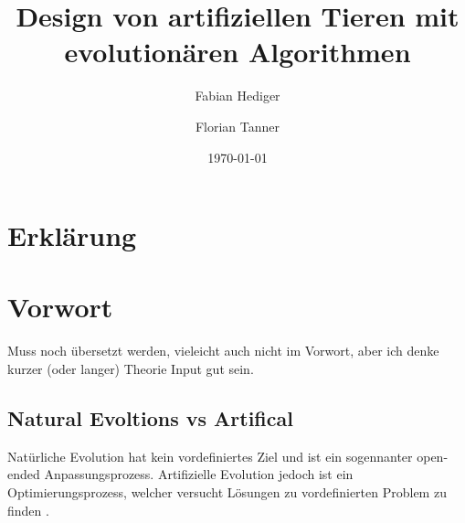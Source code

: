 %
%





  \title{Design von artifiziellen Tieren mit evolutionären Algorithmen}
  \author{Fabian Hediger \and Florian Tanner}
  \date{\today}

  \frontmatter

  
  

  \chapter{Erklärung}
    \lipsum[1]

  \chapter{Vorwort}

    Muss noch übersetzt werden, vieleicht auch nicht im Vorwort, aber ich denke kurzer (oder langer) Theorie Input gut sein.

    \section{Natural Evoltions vs Artifical}
      Natürliche Evolution hat kein vordefiniertes Ziel und ist ein sogennanter \grqq{} open-ended \grqq{} Anpassungsprozess. Artifizielle Evolution jedoch ist ein Optimierungsprozess, welcher versucht Lösungen zu vordefinierten Problem zu finden \cite[S.1]{book:bioInspired}. \\

